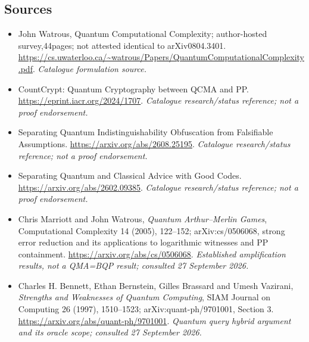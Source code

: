 \documentclass[11pt,a4paper]{article}
\numberwithin{equation}{section}
\begin{document}
\subsection{Sources}
\begin{itemize}\raggedright
\item[\textnormal{[S1]}]\hypertarget{source:30006695:1}{} John Watrous, Quantum Computational Complexity; author-hosted survey,44pages; not attested identical to arXiv0804.3401.
\url{https://cs.uwaterloo.ca/~watrous/Papers/QuantumComputationalComplexity.pdf}.
{\small\textit{Catalogue formulation source.}}
\item[\textnormal{[S2]}]\hypertarget{source:30006695:2}{} CountCrypt: Quantum Cryptography between QCMA and PP.
\url{https://eprint.iacr.org/2024/1707}.
{\small\textit{Catalogue research/status reference; not a proof endorsement.}}
\item[\textnormal{[S3]}]\hypertarget{source:30006695:3}{} Separating Quantum Indistinguishability Obfuscation from Falsifiable Assumptions.
\url{https://arxiv.org/abs/2608.25195}.
{\small\textit{Catalogue research/status reference; not a proof endorsement.}}
\item[\textnormal{[S4]}]\hypertarget{source:30006695:4}{} Separating Quantum and Classical Advice with Good Codes.
\url{https://arxiv.org/abs/2602.09385}.
{\small\textit{Catalogue research/status reference; not a proof endorsement.}}
\item[\textnormal{[E1]}]\hypertarget{extra:30006695:1}{} Chris Marriott and
John Watrous, \emph{Quantum Arthur--Merlin Games}, Computational Complexity
14 (2005), 122--152; arXiv:cs/0506068, strong error reduction and its
applications to logarithmic witnesses and PP containment.
\url{https://arxiv.org/abs/cs/0506068}.
{\small\textit{Established amplification results, not a QMA=BQP result;
consulted 27 September 2026.}}
\item[\textnormal{[E2]}]\hypertarget{extra:30006695:2}{} Charles H. Bennett,
Ethan Bernstein, Gilles Brassard and Umesh Vazirani,
\emph{Strengths and Weaknesses of Quantum Computing}, SIAM Journal on
Computing 26 (1997), 1510--1523; arXiv:quant-ph/9701001, Section 3.
\url{https://arxiv.org/abs/quant-ph/9701001}.
{\small\textit{Quantum query hybrid argument and its oracle scope;
consulted 27 September 2026.}}
\end{itemize}
\end{document}
